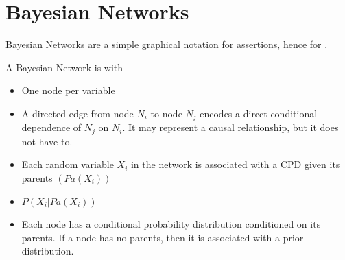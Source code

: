 \documentclass[
../EiKI_Summary.tex,
]
{subfiles}
\begin{document}
\section{Bayesian Networks}
Bayesian Networks are a simple graphical notation for  assertions, hence for .

A Bayesian Network is  with

\begin{itemize}
    \item {} One node per variable
    \item {} A directed edge from node $N_i$ to node $N_j$ encodes a direct conditional dependence of $N_j$ on $N_i$. It may represent a causal relationship, but it does not have to.
\end{itemize}


\begin{center}

\end{center}

\begin{itemize}
    \item Each random variable $X_i$ in the network is associated with a CPD given its parents $(Pa(X_i))$
    \item \begin{smallmathbox*}
            $P(X_i | Pa(X_i))$
    \end{smallmathbox*}
    \item Each node has a conditional probability distribution conditioned on its parents. If a node has no parents, then it is associated with a prior distribution.
\end{itemize}
\end{document}
